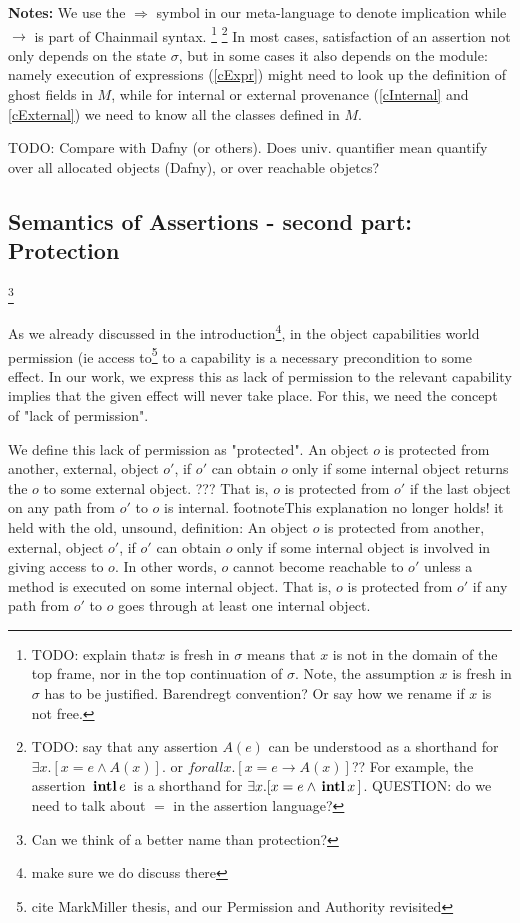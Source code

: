 \textbf{Notes:}  We use the $\Longrightarrow$ symbol in our meta-language to denote implication while $\rightarrow$ is part of Chainmail syntax.
\footnote{{TODO: explain that$x$ is fresh in $\sigma$  means that $x$ is not in the domain of the top frame, nor in the top continuation of $\sigma$.
 Note, the assumption $x$ is fresh in $\sigma$ has to be justified. Barendregt convention? Or say how we rename if $x$ is not free.}}
\footnote{{TODO: say that any assertion $A(e)$ can be understood as a shorthand for $\exists x. [ x=e \wedge A(x)]$. or  $forall x. [ x=e \rightarrow A(x)]$?? For example, the  assertion   ${{\, \mathbf{intl}\, e\, }}$ is a shorthand for $\exists x. [ x=e \wedge {{\ensuremath{\, \mathbf{intl}}\, x\, }}]$. QUESTION: do we need to talk about $=$ in the assertion language?}}
In most cases, satisfaction of an assertion not only depends on the state $\sigma$, but 
in some cases it also depends on the module: namely execution of expressions (\ref{cExpr}) might need to look up the definition of ghost fields  in $M$, while 
for internal or external provenance (\ref{cInternal} and \ref{cExternal}) we need to know all the classes defined in $M$.

TODO: Compare with Dafny (or others). Does univ. quantifier mean quantify over all allocated objects (Dafny), or over reachable objetcs?

\subsection{Semantics of Assertions - second part: Protection}\footnote{Can we think of a better name than protection?}

As we already discussed in the introduction\footnote{make sure we do discuss there}, in the object capabilities world permission (ie access to\footnote{cite MarkMiller thesis, and our Permission and Authority revisited} to a capability is a necessary precondition to some effect. In our work, we express this as lack of permission to the relevant capability implies that the given effect will never take place.
For this, we need the concept of "lack of permission".  

We define this lack of permission as "protected".  An object $o$ is protected from another, external, object $o'$, if $o'$ can obtain   $o$ only if 
some internal object returns the  $o$ to some external object. ???  That is, $o$ is protected from $o'$ if the last object on any path from $o'$ to $o$ is internal. \'footnote{This explanation no longer holds! it held with the old, unsound, definition: An object $o$ is protected from another, external, object $o'$, if $o'$ can obtain   $o$ only if 
some internal object is involved in giving access to $o$. In other words, $o$ cannot become reachable to $o'$ unless a method is executed on
some internal object. That is, $o$ is protected from $o'$ if any path from $o'$ to $o$ goes through at least one internal object.}

